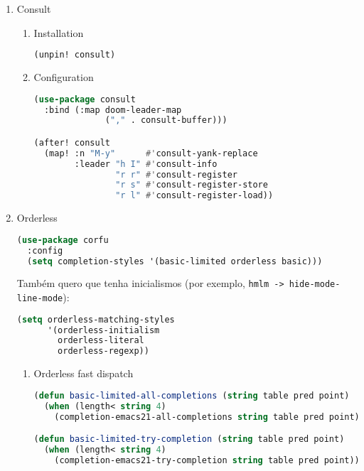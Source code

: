 \documentclass[11pt]{article}
\begin{document}
\begin{enumerate}
  \item Consult
  \label{sec:consult}

  
\begin{enumerate}
  \item Installation
  \label{sec:installation-2}

  \begin{lstlisting}[language=Lisp]
(unpin! consult)
\end{lstlisting}
  \item Configuration
  \label{sec:configuration-2}

  \begin{lstlisting}[language=Lisp]
(use-package consult
  :bind (:map doom-leader-map
              ("," . consult-buffer)))

(after! consult
  (map! :n "M-y"      #'consult-yank-replace 
        :leader "h I" #'consult-info
                "r r" #'consult-register
                "r s" #'consult-register-store
                "r l" #'consult-register-load))
\end{lstlisting}
\end{enumerate}

  \item Orderless
  \label{sec:orderless}

  \begin{lstlisting}[language=Lisp]
(use-package corfu
  :config
  (setq completion-styles '(basic-limited orderless basic)))
\end{lstlisting}

Também quero que tenha inicialismos (por exemplo, \texttt{hmlm -> hide-mode-line-mode}):

\begin{lstlisting}[language=Lisp]
(setq orderless-matching-styles
      '(orderless-initialism
        orderless-literal
        orderless-regexp))
\end{lstlisting}
\begin{enumerate}
  \item Orderless fast dispatch
  \label{sec:orderless-fast-dispatch}

  \begin{lstlisting}[language=Lisp]
(defun basic-limited-all-completions (string table pred point)
  (when (length< string 4)
    (completion-emacs21-all-completions string table pred point)))

(defun basic-limited-try-completion (string table pred point)
  (when (length< string 4)
    (completion-emacs21-try-completion string table pred point)))


\end{lstlisting}
\end{enumerate}
\end{enumerate}
\end{document}
